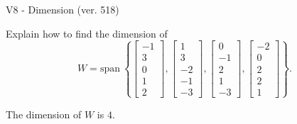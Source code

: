 \begin{exercise}
  \begin{exerciseTitle}V8 - Dimension (ver. 518)\end{exerciseTitle}
  \begin{exerciseStatement}
    Explain how to find the dimension of 
\[W=\mathrm{span}\ \left\{\left[\begin{array}{r}
-1 \\
3 \\
0 \\
1 \\
2
\end{array}\right] , \left[\begin{array}{r}
1 \\
3 \\
-2 \\
-1 \\
-3
\end{array}\right] , \left[\begin{array}{r}
0 \\
-1 \\
2 \\
1 \\
-3
\end{array}\right] , \left[\begin{array}{r}
-2 \\
0 \\
2 \\
2 \\
1
\end{array}\right]\right\}.\]



  \end{exerciseStatement}
  \begin{exerciseAnswer}
   The dimension of \(W\) is  \(4\).
  


  \end{exerciseAnswer}
\end{exercise}